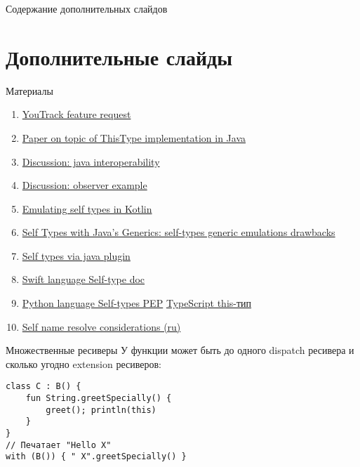 \documentclass[handout,aspectratio=169,usenames,dvipsnames]{beamer}
\begin{document}
\appendix

\begin{frame}{Содержание дополнительных слайдов}
    \tableofcontents
\end{frame}

\section{Дополнительные слайды}

\begin{frame}{Материалы}
    \begin{enumerate}
        \item \href{https://youtrack.jetbrains.com/issue/KT-6494}{\color{blue} YouTrack feature request}
        \item \href{https://dl.acm.org/doi/10.1145/2888392}{\color{blue} Paper on topic of ThisType implementation in Java}
        \item \href{https://discuss.kotlinlang.org/t/self-types/371}{\color{blue} Discussion: java interoperability}
        \item \href{https://discuss.kotlinlang.org/t/this-type/1421}{\color{blue} Discussion: observer example}
        \item \href{https://medium.com/@jerzy.chalupski/emulating-self-types-in-kotlin-d64fe8ea2e62}{\color{blue} Emulating self types in Kotlin}
        \item \href{https://www.sitepoint.com/self-types-with-javas-generics/}{\color{blue} Self Types with Java’s Generics: self-types generic emulations drawbacks}
        \item \href{https://github.com/manifold-systems/manifold}{\color{blue} Self types via java plugin}
        \item \href{https://docs.swift.org/swift-book/documentation/the-swift-programming-language/types/\#Self-Type}{\color{blue} Swift language Self-type doc}
        \item \href{https://peps.python.org/pep-0673/}{\color{blue} Python language Self-types PEP}
        \href{https://www.typescriptlang.org/docs/handbook/2/classes.html\#this-types}{\color{blue}TypeScript this-тип}
        \item \href{https://maximgran.notion.site/maximgran/Self-types-58e89d6dda374ba9abb4483b192a49c2}{\color{blue} Self name resolve considerations (ru)}
    \end{enumerate}
\end{frame}

\begin{frame}[fragile]{Множественные ресиверы}
   У функции может быть до одного dispatch ресивера и сколько угодно extension ресиверов:
   \begin{verbatim}
class C : B() {
    fun String.greetSpecially() {
        greet(); println(this)
    }
}
// Печатает "Hello X"
with (B()) { " X".greetSpecially() }
   \end{verbatim}
\end{frame}
\end{document}
